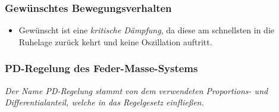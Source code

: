 			\subsubsection{Gewünschtes Bewegungsverhalten} %
				\begin{itemize}
					\item Gewünscht ist eine \textit{kritische Dämpfung}, da diese am schnellsten in die Ruhelage zurück kehrt und keine Oszillation auftritt.
				\end{itemize}
			
			\subsubsection{PD-Regelung des Feder-Masse-Systems} %
				\textit{Der Name PD-Regelung stammt von dem verwendeten Proportions- und Differentialanteil, welche in das Regelgesetz einfließen.}
			
